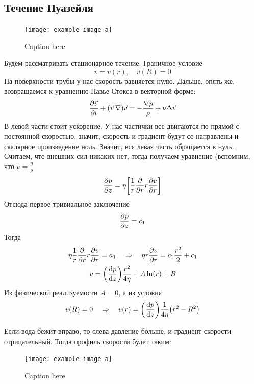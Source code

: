 \subsection{Течение Пуазейля}
\begin{figure}[h!]
    \centering
    \texttt{[image: example-image-a]}
    \caption{Caption here}
    \label{fig:figure1}
\end{figure}
Будем рассматривать стационарное течение. Граничное условие
\begin{equation}
    v = v(r), \quad v(R) = 0
\end{equation}
На поверхности трубы у нас скорость равняется нулю. Дальше, 
опять же, возвращаемся к уравнению Навье-Стокса в векторной форме:
\begin{equation}
    \pdv{\vec{v}}{t}+(\vec{v}\,\nabla)\vec{v} = 
    - \frac{\nabla p}{\rho}+\nu \Delta \vec{v}
\end{equation}
В левой части стоит ускорение. У нас частички все двигаются по прямой с постоянной скоростью, значит, скорость и градиент будут со направлены и скалярное произведение ноль. Значит, вся левая часть обращается в нуль. Считаем, что внешних сил никаких нет, тогда получаем уравнение (вспомним, что $\nu = \frac{\eta}{\rho}$
\begin{equation}
    \pdv{p}{z} = \eta 
   \qty[
   \frac{1}{r} \pdv{r} r \pdv{v}{r}
   ]
\end{equation}
Отсюда первое тривиальное заключение
\begin{equation}
    \pdv{p}{z} = c_1
\end{equation}
Тогда
\begin{gather}
    \eta\frac{1}{r} \pdv{r} r \pdv{v}{r} = a_1
    \quad \Rightarrow \quad
    \eta r\pdv{v}{r} = c_1 \frac{r^2}{2} + c_{1}\\
    v = \qty(\dv{p}{z}) \frac{r^2}{4\eta}+A \ln(r) + B
\end{gather}
Из физической реализуемости $A = 0$, а из условия
\begin{equation}
    v(R) = 0 \quad \Rightarrow \quad
    v(r) = \qty(\dv{p}{z}) \frac{1}{4\eta}\qty(r^2-R^2)
\end{equation}

Если вода бежит вправо, то слева давление больше, и градиент скорости отрицательный. Тогда профиль скорости будет таким:

\begin{figure}[h!]
    \centering
    \texttt{[image: example-image-a]}
    \caption{Caption here}
    \label{fig:figure1}
\end{figure}

